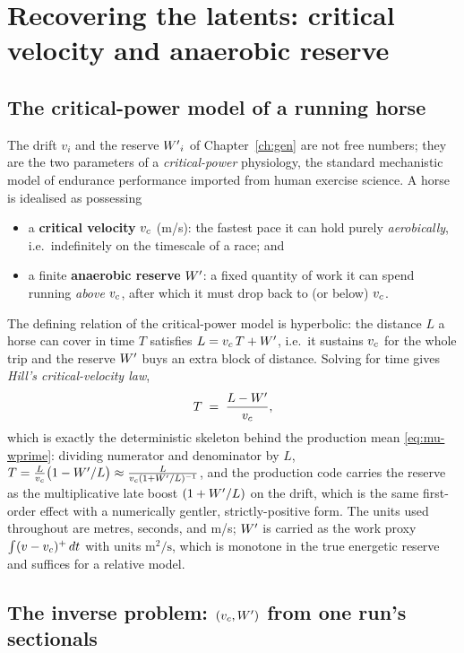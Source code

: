 \chapter{Recovering the latents: critical velocity and anaerobic reserve}
\label{ch:energetics}

\section{The critical-power model of a running horse}

The drift $v_i$ and the reserve ${W^{\prime}}_i$ of Chapter~\ref{ch:gen} are not free numbers; they are the
two parameters of a \emph{critical-power} physiology, the standard mechanistic model of endurance
performance imported from human exercise science. A horse is idealised as possessing
\begin{itemize}
  \item a \textbf{critical velocity} ${v_{c}}$ (m/s): the fastest pace it can hold purely
        \emph{aerobically}, i.e.\ indefinitely on the timescale of a race; and
  \item a finite \textbf{anaerobic reserve} ${W^{\prime}}$: a fixed quantity of work it can spend running
        \emph{above} ${v_{c}}$, after which it must drop back to (or below) ${v_{c}}$.
\end{itemize}
The defining relation of the critical-power model is hyperbolic: the distance $L$ a horse can
cover in time $T$ satisfies $L = {v_{c}}\,T + {W^{\prime}}$, i.e.\ it sustains ${v_{c}}$ for the whole trip and the
reserve ${W^{\prime}}$ buys an extra block of distance. Solving for time gives \emph{Hill's
critical-velocity law},
\begin{equation}
  T \;=\; \frac{L - {W^{\prime}}}{{v_{c}}},
  \label{eq:hill}
\end{equation}
which is exactly the deterministic skeleton behind the production mean
\eqref{eq:mu-wprime}: dividing numerator and denominator by $L$,
$T = \frac{L}{{v_{c}}}\bigl(1 - {W^{\prime}}/L\bigr) \approx \frac{L}{{v_{c}}(1+{W^{\prime}}/L)^{-1}}$, and the production
code carries the reserve as the multiplicative late boost $(1+{W^{\prime}}/L)$ on the drift, which is the
same first-order effect with a numerically gentler, strictly-positive form. The units used
throughout are metres, seconds, and m/s; ${W^{\prime}}$ is carried as the work proxy
$\int (v-{v_{c}})^{+}\,dt$ with units $\mathrm{m^2/s}$, which is monotone in the true energetic
reserve and suffices for a relative model.

\section{The inverse problem: $({v_{c}},{W^{\prime}})$ from one run's sectionals}


